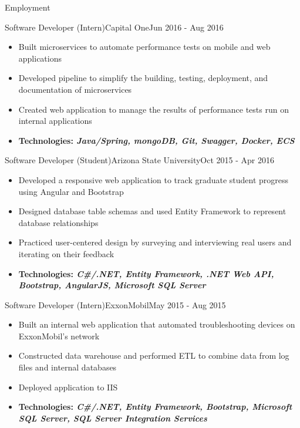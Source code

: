 \documentclass[]{mcdowellcv}
\begin{document}
\begin{cvsection}{Employment}
		\begin{cvsubsection}{Software Developer (Intern)}{Capital One}{Jun 2016 - Aug 2016}
			\begin{itemize}
				\item Built microservices to automate performance tests on mobile and web applications
				\item Developed pipeline to simplify the building, testing, deployment, and documentation of microservices
				\item Created web application to manage the results of performance tests run on internal applications
				\item \textbf{Technologies: \emph{Java/Spring, mongoDB, Git, Swagger, Docker, ECS}}
			\end{itemize}
		\end{cvsubsection}

		\begin{cvsubsection}{Software Developer (Student)}{Arizona State University}{Oct 2015 - Apr 2016}
			\begin{itemize}
				\item Developed a responsive web application to track graduate student progress using Angular and Bootstrap
				\item Designed database table schemas and used Entity Framework to represent database relationships
				\item Practiced user-centered design by surveying and interviewing real users and iterating on their feedback
				\item \textbf{Technologies: \emph{C#/.NET, Entity Framework, .NET Web API, Bootstrap, AngularJS, Microsoft SQL Server}}
			\end{itemize}
		\end{cvsubsection}

		\begin{cvsubsection}{Software Developer (Intern)}{ExxonMobil}{May 2015 - Aug 2015}
			\begin{itemize}
				\item Built an internal web application that automated troubleshooting devices on ExxonMobil’s network
				\item Constructed data warehouse and performed ETL to combine data from log files and internal databases
				\item Deployed application to IIS
				\item \textbf{Technologies: \emph{C#/.NET, Entity Framework, Bootstrap, Microsoft SQL Server, SQL Server Integration Services}}
			\end{itemize}
		\end{cvsubsection}
	\end{cvsection}
\end{document}
